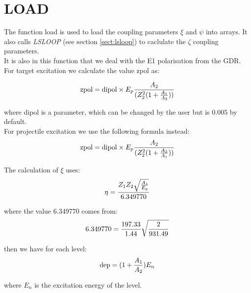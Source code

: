 \section{LOAD}
\label{sect:load}

The function load is used to load the coupling parameters $\xi$ and $\psi$
into arrays. It also calls {\em LSLOOP} (see section \ref{sect:lsloop}) to
caclulate the $\zeta$ coupling parameters.\\

\noindent It is also in this function that we deal with the E1 polarisation from the
GDR. For target excitation we calculate the value zpol as:

\begin{equation}
\mathrm{zpol} = \mathrm{dipol} \times E_p {A_2 \over(Z_2^2 (1 + {A_1 \over
A_2}))}
\end{equation}

\noindent where dipol is a parameter, which can be changed by the user but is 0.005 by
default.\\

\noindent For projectile excitation we use the following formula instead:\\

\begin{equation}
\mathrm{zpol} = \mathrm{dipol} \times E_p {A_2 \over(Z_2^2 (1 + {A_2 \over
A_1}))}
\end{equation}

\noindent The calculation of $\xi$ uses:\\

\begin{equation}
\eta = {Z_1 Z_2 \sqrt{A_1 \over E_p} \over 6.349770}
\end{equation}

\noindent where the value 6.349770 comes from:\\

\begin{equation}
6.349770 = {197.33 \over 1.44} \sqrt{2 \over 931.49}
\end{equation}

\noindent then we have for each level:\\

\begin{equation}
\mathrm{dep} = \large( 1 + {A_1 \over A_2} \large) E_n
\end{equation}

\noindent where $E_n$ is the excitation energy of the level.\\

